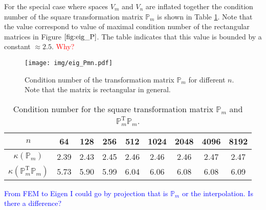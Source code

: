 \documentclass[a4paper,10pt]{article}
\newcommand{\Pmat}{\ensuremath{\mathbb{P}_m}}                  %
\newcommand{\Pmatt}{\ensuremath{\mathbb{P}_m^{\text{T}}}}       %
\newcommand{\TODO}[1]{\textcolor{red}{#1}}
\newcommand{\ASK}[1]{\textcolor{blue}{#1}}
\begin{document}
  For the special case where spaces $V_m$ and $V_n$ are inflated together the
  condition number of the square transformation matrix $\Pmat$ is shown in
  Table \ref{tab:eig_P}. Note that the value correspond to value of maximal
  condition number of the rectangular matrices in Figure $\ref{fig:eig_P}$. 
  The table indicates that this value is bounded by a constant $\approx 2.5$.  
  \TODO{Why?}
  
  \begin{figure}
  \begin{center}
    \texttt{[image: img/eig\_Pmn.pdf]}
  \end{center}
  \label{fig:eig_P}
  \caption{Condition number of the transformation matrix $\Pmat$ for different $n$.
    Note that the matrix is rectangular in general.}
  \end{figure}
  \begin{table}
    \begin{center}
    \begin{tabular}{|c||c|c|c|c|c|c|c|c|}
      \hline
      $n$           &   64&  128&  256&  512& 1024& 2048& 4096& 8192\\
      \hline\hline
      $\kappa(\Pmat)$ & 2.39& 2.43& 2.45& 2.46& 2.46& 2.46& 2.47& 2.47\\
      \hline
      $\kappa(\Pmatt\Pmat)$ & 5.73& 5.90& 5.99& 6.04& 6.06& 6.08& 6.08&
      6.09\\
      \hline
    \end{tabular}
  \caption{Condition number for the square transformation matrix $\Pmat$ and
  $\Pmatt\Pmat$.}
  \label{tab:eig_P}
  \end{center}
  \end{table}
  \ASK{From FEM to Eigen I could go by projection that is $\Pmat$ or the
  interpolation. Is there a difference?}
\end{document}
